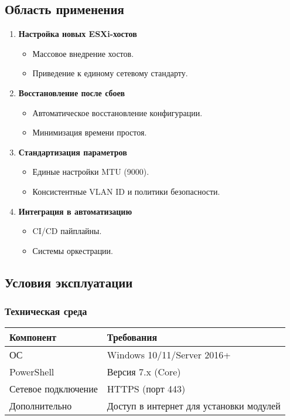 \subsection{Область применения}
\begin{enumerate}
    \item \textbf{Настройка новых ESXi-хостов}
    \begin{itemize}
        \item Массовое внедрение хостов.
        \item Приведение к единому сетевому стандарту.
    \end{itemize}
    
    \item \textbf{Восстановление после сбоев}
    \begin{itemize}
        \item Автоматическое восстановление конфигурации.
        \item Минимизация времени простоя.
    \end{itemize}
    
    \item \textbf{Стандартизация параметров}
    \begin{itemize}
        \item Единые настройки MTU (9000).
        \item Консистентные VLAN ID и политики безопасности.
    \end{itemize}
    
    \item \textbf{Интеграция в автоматизацию}
    \begin{itemize}
        \item CI/CD пайплайны.
        \item Системы оркестрации.
    \end{itemize}
\end{enumerate}

\subsection{Условия эксплуатации}
\subsubsection{Техническая среда}
\begin{table}[h]
\centering
\begin{tabular}{|l|l|}
\hline
\textbf{Компонент} & \textbf{Требования} \\ \hline
ОС & Windows 10/11/Server 2016+ \\ \hline
PowerShell & Версия 7.x (Core) \\ \hline
Сетевое подключение & HTTPS (порт 443) \\ \hline
Дополнительно & Доступ в интернет для установки модулей \\ \hline
\end{tabular}
\end{table}

